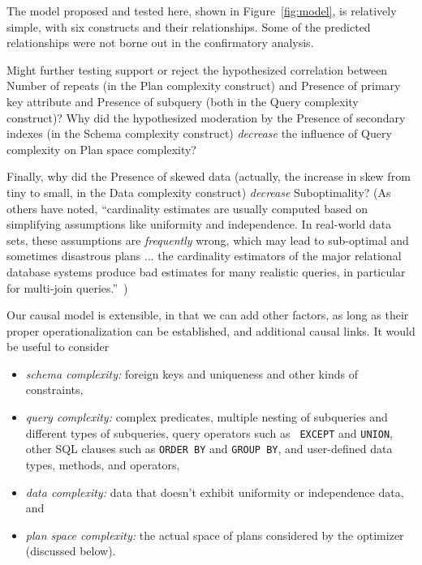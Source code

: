 \documentclass[prodmode,acmtods]{acmsmall}
\begin{document}
The model proposed and tested here, shown in Figure~\ref{fig:model}, is
relatively simple, with six constructs and their relationships. Some of the
predicted relationships were not borne out in the confirmatory analysis.

Might
further testing support or reject the hypothesized correlation between Number
of repeats (in the Plan complexity construct) and Presence of primary key
attribute and Presence of subquery (both in the Query complexity construct)? Why did the hypothesized moderation
  by the Presence of secondary indexes (in the Schema complexity construct)
  {\em decrease} the influence of Query complexity on Plan space complexity?


Finally, why did the Presence of skewed data (actually, the increase in skew
from tiny to small, in the Data complexity construct)
  {\em decrease} Suboptimality? (As others have noted, ``cardinality
  estimates are usually computed based on simplifying assumptions like
  uniformity and independence. In real-world data sets, these assumptions
  are {\em frequently} wrong, which may lead to sub-optimal and sometimes
  disastrous plans ... the cardinality estimators of the major relational
  database systems produce bad estimates for many realistic queries, in
  particular for multi-join queries.''~\cite{Leis15})

Our causal
model is extensible, in that we can add other factors, as long as their proper
operationalization can be established, and additional causal links. It would be
useful to consider
\begin{itemize}
\item {\em schema complexity:} foreign keys and
uniqueness and other kinds of constraints, 
\item {\em query complexity:} complex predicates, multiple nesting of
  subqueries and different types of subqueries, query operators such as {\tt
    EXCEPT} and {\tt UNION}, other
SQL clauses such as {\tt ORDER BY} and {\tt GROUP BY}, and user-defined data
types, methods, and operators,
\item {\em data complexity:} data that doesn't exhibit uniformity or independence
  data, and
\item {\em plan space complexity:} the actual space of plans considered by
  the optimizer (discussed below).
\end{itemize}
\end{document}
